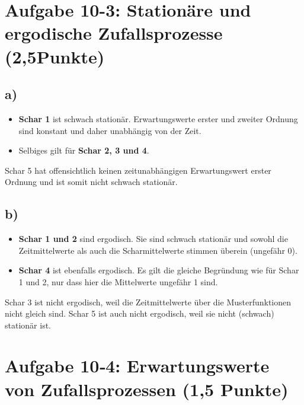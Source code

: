 \documentclass[11pt]{scrartcl} %
\begin{document}
\section*{Aufgabe 10-3: Stationäre und ergodische Zufallsprozesse (2,5Punkte)}
\subsection*{a)}
\begin{itemize}
\item \textbf{Schar 1} ist schwach stationär. Erwartungswerte erster und zweiter Ordnung sind konstant und daher unabhängig von der Zeit.
\item Selbiges gilt für \textbf{Schar 2, 3 und 4}. 
\end{itemize}
Schar 5 hat offensichtlich keinen zeitunabhängigen Erwartungswert erster Ordnung und ist somit nicht schwach stationär.

\subsection*{b)}
\begin{itemize}
\item \textbf{Schar 1 und 2} sind ergodisch. Sie sind schwach stationär und sowohl die Zeitmittelwerte als auch die Scharmittelwerte stimmen überein (ungefähr 0).
\item \textbf{Schar 4} ist ebenfalls ergodisch. Es gilt die gleiche Begründung wie für Schar 1 und 2, nur dass hier die Mittelwerte ungefähr 1 sind.
\end{itemize}
Schar 3 ist nicht ergodisch, weil die Zeitmittelwerte über die Musterfunktionen nicht gleich sind. Schar 5 ist auch nicht ergodisch, weil sie nicht (schwach) stationär ist.


\section*{Aufgabe 10‐4: Erwartungswerte von Zufallsprozessen (1,5 Punkte)}
\end{document}
